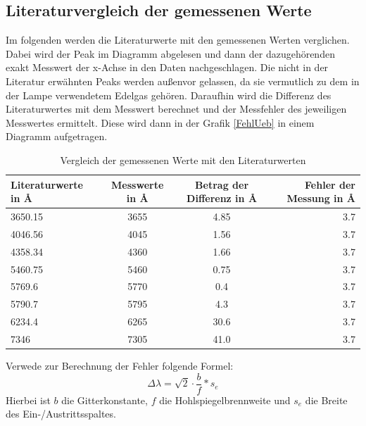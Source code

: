 \subsection{Literaturvergleich der gemessenen Werte} \label{Messlit}

Im folgenden werden die Literaturwerte \cite[S. 1474]{CRCHandbook2003} mit den gemessenen Werten verglichen. Dabei wird der Peak im Diagramm abgelesen und dann der dazugehörenden 
exakt Messwert der x-Achse in den Daten nachgeschlagen. Die nicht in der Literatur erwähnten Peaks werden außenvor gelassen, da sie vermutlich zu dem in der Lampe verwendetem Edelgas 
gehören. Daraufhin wird die Differenz des Literaturwertes mit dem Messwert berechnet und der Messfehler des jeweiligen Messwertes ermittelt. Diese wird dann in der Grafik \ref{FehlUeb} 
in einem Diagramm aufgetragen.
\begin{table}[h]
    \centering
    \begin{tabular}[h]{l|c|c|r}


        Literaturwerte in \r{A} & Messwerte in \r{A} & Betrag der Differenz in \r{A} & Fehler der Messung in \r{A}\\
       \hline
       3650.15  & 3655 & 4.85 & 3.7\\
       4046.56  & 4045 & 1.56 & 3.7\\
       4358.34 & 4360 & 1.66  & 3.7\\
       5460.75 & 5460 & 0.75 & 3.7\\
       5769.6  & 5770 & 0.4 & 3.7\\
       5790.7  & 5795 & 4.3 & 3.7\\
       6234.4  & 6265 & 30.6 & 3.7\\
       7346  & 7305 & 41.0 & 3.7\\
\end{tabular}
    \caption{Vergleich der gemessenen Werte mit den Literaturwerten}
\end{table}
Verwede zur Berechnung der Fehler folgende Formel:
\begin{equation}
    \Delta \lambda = \sqrt{2} \cdot\frac{b}{f}*s_e 
\end{equation}
Hierbei ist $b$ die Gitterkonstante, $f$ die Hohlspiegelbrennweite und $s_e$ die Breite des Ein-/Austrittsspaltes.\\
